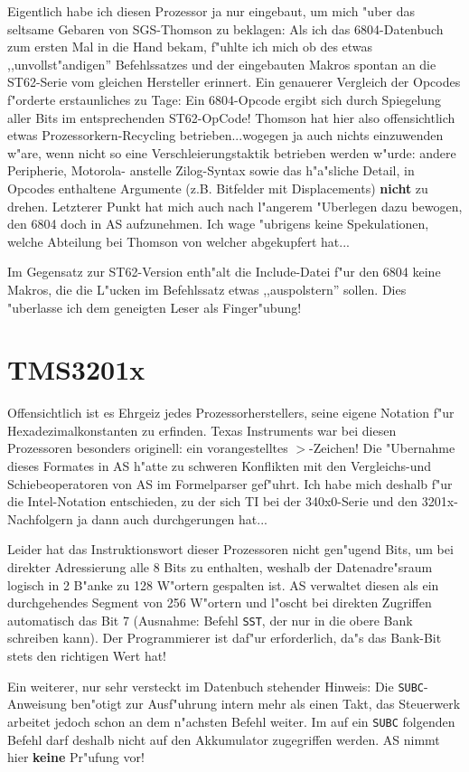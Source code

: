 \documentclass[12pt,a4paper,twoside]{report}
\newcommand{\bb}[1]{{\bf #1}}
\newcommand{\tty}[1]{{\tt #1}}
\newcommand{\asname}{AS}
\begin{document}
Eigentlich habe ich diesen Prozessor ja nur eingebaut, um mich "uber
das seltsame Gebaren von SGS-Thomson zu beklagen: Als ich das
6804-Datenbuch zum ersten Mal in die Hand bekam, f"uhlte ich mich ob des
etwas ,,unvollst"andigen'' Befehlssatzes und der eingebauten Makros
spontan an die ST62-Serie vom gleichen Hersteller erinnert.  Ein
genauerer Vergleich der Opcodes f"orderte erstaunliches zu Tage:
Ein 6804-Opcode ergibt sich durch Spiegelung aller Bits im entsprechenden
ST62-OpCode!  Thomson hat hier also offensichtlich etwas
Prozessorkern-Recycling betrieben...wogegen ja auch nichts einzuwenden
w"are, wenn nicht so eine Verschleierungstaktik betrieben werden w"urde:
andere Peripherie, Motorola- anstelle Zilog-Syntax sowie das h"a"sliche
Detail, in Opcodes enthaltene Argumente (z.B. Bitfelder mit Displacements)
\bb{nicht} zu drehen. Letzterer Punkt hat mich auch nach l"angerem "Uberlegen
dazu bewogen, den 6804 doch in \asname{} aufzunehmen.  Ich wage "ubrigens keine
Spekulationen, welche Abteilung bei Thomson von welcher abgekupfert hat...
\par
Im Gegensatz zur ST62-Version enth"alt die Include-Datei f"ur den
6804 keine Makros, die die L"ucken im Befehlssatz etwas ,,auspolstern''
sollen.  Dies "uberlasse ich dem geneigten Leser als Finger"ubung!


\section{TMS3201x}

Offensichtlich ist es Ehrgeiz jedes Prozessorherstellers, seine eigene
Notation f"ur Hexadezimalkonstanten zu erfinden.  Texas Instruments
war bei diesen Prozessoren besonders originell: ein vorangestelltes
$>$-Zeichen!  Die "Ubernahme dieses Formates in \asname{} h"atte zu schweren
Konflikten mit den Vergleichs-und Schiebeoperatoren von \asname{} im Formelparser
gef"uhrt.  Ich habe mich deshalb f"ur die Intel-Notation entschieden, zu
der sich TI bei der 340x0-Serie und den 3201x-Nachfolgern ja dann auch
durchgerungen hat...
\par
Leider hat das Instruktionswort dieser Prozessoren nicht gen"ugend Bits,
um bei direkter Adressierung alle 8 Bits zu enthalten, weshalb der
Datenadre"sraum logisch in 2 B"anke zu 128 W"ortern gespalten ist.  \asname{}
verwaltet diesen als ein durchgehendes Segment von 256 W"ortern und
l"oscht bei direkten Zugriffen automatisch das Bit 7 (Ausnahme: Befehl
\tty{SST}, der nur in die obere Bank schreiben kann). Der Programmierer
ist daf"ur erforderlich, da"s das Bank-Bit stets den richtigen Wert hat!
\par
Ein weiterer, nur sehr versteckt im Datenbuch stehender Hinweis: Die
\tty{SUBC}-Anweisung ben"otigt zur Ausf"uhrung intern mehr als einen
Takt, das Steuerwerk arbeitet jedoch schon an dem n"achsten Befehl weiter.
Im auf ein \tty{SUBC} folgenden Befehl darf deshalb nicht auf den
Akkumulator zugegriffen werden.  \asname{} nimmt hier \bb{keine} Pr"ufung vor!
\end{document}
